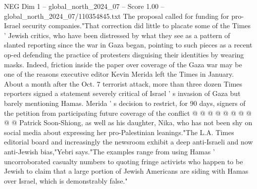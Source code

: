 \begin{textsample}{NEG Dim 1 – global\_north\_2024\_07 – Score 1.00 – global\_north\_2024\_07/110354845.txt}
The proposal called for funding for pro-Israel security companies."That correction did little to placate some of the Times ' Jewish critics, who have been distressed by what they see as a pattern of slanted reporting since the war in Gaza began, pointing to such pieces as a recent op-ed defending the practice of protesters disguising their identities by wearing masks.
Indeed, friction inside the paper over coverage of the Gaza war may be one of the reasons executive editor Kevin Merida left the Times in January.
About a month after the Oct. 7 terrorist attack, more than three dozen Times reporters signed a statement severely critical of Israel ' s invasion of Gaza but barely mentioning Hamas.
Merida ' s decision to restrict, for 90 days, signers of the petition from participating future coverage of the conflict @ @ @ @ @ @ @ @ @ @ Patrick Soon-Shiong, as well as his daughter, Nika, who has not been shy on social media about expressing her pro-Palestinian leanings."The L.A.
Times editorial board and increasingly the newsroom exhibit a deep anti-Israeli and now anti-Jewish bias,"Yebri says."The examples range from using Hamas ' uncorroborated casualty numbers to quoting fringe activists who happen to be Jewish to claim that a large portion of Jewish Americans are siding with Hamas over Israel, which is demonstrably false."

\end{textsample}
